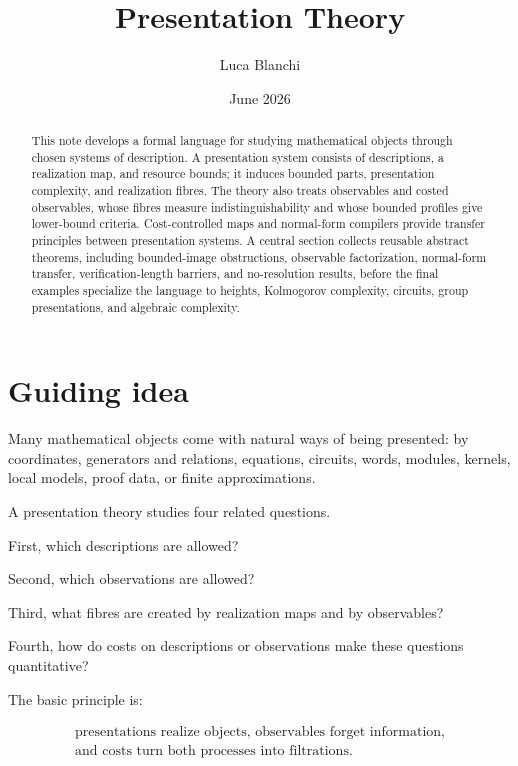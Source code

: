 \documentclass[11pt]{article}
\title{Presentation Theory}
\author{Luca Blanchi}
\date{June 2026}
\begin{document}
\maketitle

\begin{abstract}
This note develops a formal language for studying mathematical objects through chosen systems of description. A presentation system consists of descriptions, a realization map, and resource bounds; it induces bounded parts, presentation complexity, and realization fibres. The theory also treats observables and costed observables, whose fibres measure indistinguishability and whose bounded profiles give lower-bound criteria. Cost-controlled maps and normal-form compilers provide transfer principles between presentation systems. A central section collects reusable abstract theorems, including bounded-image obstructions, observable factorization, normal-form transfer, verification-length barriers, and no-resolution results, before the final examples specialize the language to heights, Kolmogorov complexity, circuits, group presentations, and algebraic complexity.
\end{abstract}

\section{Guiding idea}

Many mathematical objects come with natural ways of being presented: by coordinates, generators and relations, equations, circuits, words, modules, kernels, local models, proof data, or finite approximations.

A presentation theory studies four related questions.

First, which descriptions are allowed?

Second, which observations are allowed?

Third, what fibres are created by realization maps and by observables?

Fourth, how do costs on descriptions or observations make these questions quantitative?

The basic principle is:

\[
\begin{gathered}
\text{presentations realize objects, observables forget information,}\\
\text{and costs turn both processes into filtrations.}
\end{gathered}
\]
\end{document}
